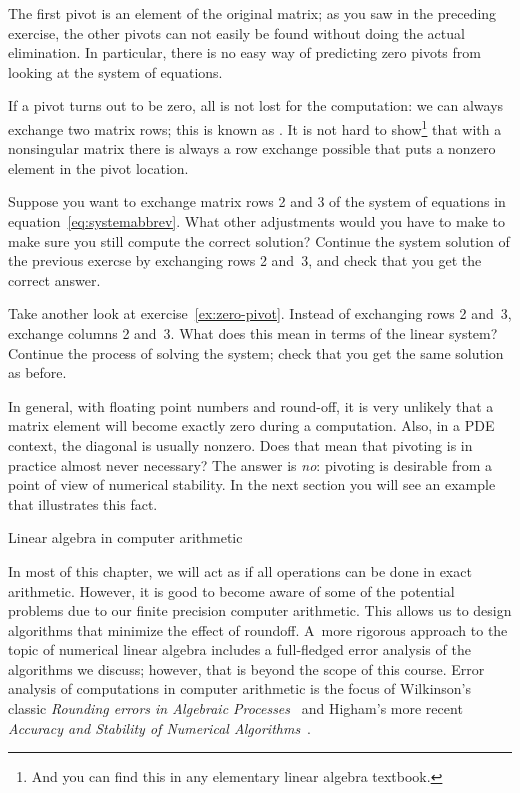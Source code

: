 The first pivot is an element of the original matrix; as you saw in
the preceding exercise, the other pivots can not easily be found
without doing the actual elimination. In particular, there is no easy
way of predicting zero pivots from looking at the system of equations.

If a pivot turns out to be zero, all is not lost for the computation:
we can always exchange two matrix rows; this is known as
.  It is not hard to show\footnote{And you can
  find this in any elementary linear algebra textbook.} that with a
nonsingular matrix there is always a row exchange possible that puts a
nonzero element in the pivot location.

\begin{exercise}
  Suppose you want to exchange matrix rows 2 and 3 of the system of
  equations in equation~\eqref{eq:systemabbrev}. What other
  adjustments would you have to make to make sure you still compute the
  correct solution? 
  Continue the system solution of the previous exercse
  by exchanging rows 2 and~3, and check that you get the correct answer.
\end{exercise}

\begin{exercise}
  Take another look at exercise~\ref{ex:zero-pivot}.  Instead of
  exchanging rows 2 and~3, exchange columns 2 and~3. What does this
  mean in terms of the linear system? Continue the
  process of solving the system; check that you get the same solution
  as before.
\end{exercise}

In general, with floating point numbers and round-off, it is very
unlikely that a matrix element will become exactly zero during a
computation. Also, in a \ac{PDE} context, the diagonal is usually nonzero.
Does that mean that pivoting is in practice almost never
necessary? The answer is \emph{no}: pivoting is desirable from a point
of view of numerical stability. In the next section you will see an
example that illustrates this fact.

 {Linear algebra in computer arithmetic}
\label{sec:linear-arith}

In most of this chapter, we will act as if all operations
can be done in exact arithmetic. However, it is good to become aware
of some of the potential problems due to our finite precision computer
arithmetic. This allows us to design algorithms that minimize the effect
of roundoff. A~more rigorous approach to the topic of numerical linear
algebra includes a full-fledged error analysis of the algorithms we
discuss; however, that is beyond the scope of this course.
%
Error analysis of computations in computer arithmetic is the focus of
Wilkinson's classic {\it Rounding errors in Algebraic
  Processes}~\cite{Wilkinson:roundoff} and Higham's more recent {\it
  Accuracy and Stability of Numerical
  Algorithms}~\cite{Higham:2002:ASN}. 

